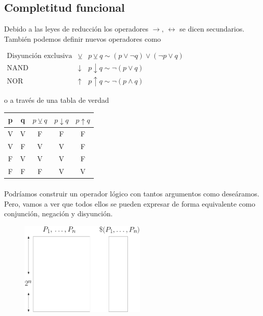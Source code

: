 \subsection{Completitud funcional}
Debido a las leyes de reducción los operadores $\rightarrow, \, \leftrightarrow$ se dicen secundarios. También podemos definir nuevos operadores como 
\begin{center}
 $\begin{array}{ccc}
 \mbox{Disyunción exclusiva}  & \veebar & p\veebar q \sim (p \lor \neg q) \lor (\neg p \lor q) \\ 
 \mbox{NAND} & \downarrow & p\downarrow q \sim \neg( p \lor q) \\ 
 \mbox{NOR} & \uparrow & p\uparrow q \sim \neg( p \wedge q)
 \end{array}  $ 
 \end{center} 
 o a través de una tabla de verdad  
\begin{center}
 \begin{tabular}{|c|c|c|c|c|}
 \hline 
 p & q & $p\veebar q$ & $p\downarrow q$ & $p\uparrow q$ \\ 
 \hline 
 V & V & F & F & F \\ 
 \hline 
 V & F & V & V & F \\ 
 \hline 
 F & V & V & V & F \\ 
 \hline 
 F & F & F & V & V \\ 
 \hline 
 \end{tabular} 
\end{center}
\paragraph{}
Podríamos construir un operador lógico con tantos argumentos como deseáramos. Pero, vamos a ver que todos ellos se pueden expresar de forma equivalente como conjunción, negación y disyunción. 
\begin{figure}[h]
\centering
\includegraphics[width=6cm]{completitud.png}
\end{figure}
